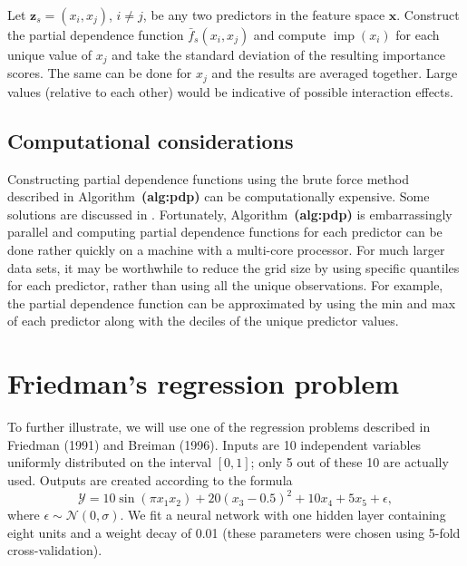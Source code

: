\documentclass[12pt]{article}
\def\ref#1{\textbf{(#1)}}
\DeclareMathOperator{\imp}{imp}
\begin{document}
Let $\boldsymbol{z}_s = \left(x_i, x_j\right)$, $i \neq j$, be any two predictors in the feature space $\boldsymbol{x}$. Construct the partial dependence function $\bar{f}_s\left(x_i, x_j\right)$ and compute $\imp\left(x_i\right)$ for each unique value of $x_j$ and take the standard deviation of the resulting importance scores. The same can be done for $x_j$ and the results are averaged together. Large values (relative to each other) would be indicative of possible interaction effects. 


\subsection{Computational considerations}

Constructing partial dependence functions using the brute force method described in Algorithm~\ref{alg:pdp} can be computationally expensive. Some solutions are discussed in \citet{pdp-greenwell-2017}. Fortunately, Algorithm~\ref{alg:pdp} is embarrassingly parallel and computing partial dependence functions for each predictor can be done rather quickly on a machine with a multi-core processor. For much larger data sets, it may be worthwhile to reduce the grid size by using specific quantiles for each predictor, rather than using all the unique observations. For example, the partial dependence function can be approximated by using the min and max of each predictor along with the deciles of the unique predictor values.


\section{Friedman's regression problem}

To further illustrate, we will use one of the regression problems described in Friedman (1991) and Breiman (1996). Inputs are 10 independent variables uniformly distributed on the interval $\left[0, 1\right]$; only 5 out of these 10 are actually used. Outputs are created according to the formula
\begin{equation}
\mathcal{Y} = 10 \sin\left(\pi x_1 x_2\right) + 20 \left(x_3 - 0.5\right) ^ 2 + 10 x_4 + 5 x_5 + \epsilon,
\end{equation}
where $\epsilon \sim \mathcal{N}\left(0, \sigma\right)$. We fit a neural network with one hidden layer containing eight units and a weight decay of 0.01 (these parameters were chosen using 5-fold cross-validation). %
\end{document}

